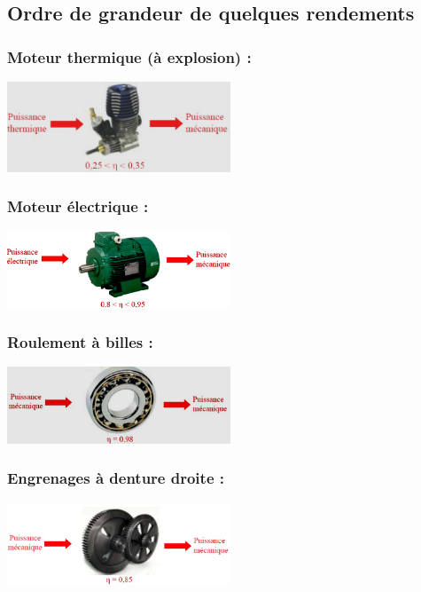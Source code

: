 \documentclass[10pt,fleqn]{article} %
\begin{document}
\subsection{Ordre de grandeur de quelques rendements}
\subsubsection{Moteur thermique (à explosion) :}
\begin{center}
    \includegraphics[width=0.5\textwidth]{Cours/images/thermique.png}
\end{center}

\subsubsection{Moteur électrique :}
\begin{center}
    \includegraphics[width=0.5\textwidth]{Cours/images/eletrique.png}
\end{center}

\subsubsection{Roulement à billes :}
\begin{center}
    \includegraphics[width=0.5\textwidth]{Cours/images/roulement.png}
\end{center}

\subsubsection{Engrenages à denture droite :}
\begin{center}
    \includegraphics[width=0.5\textwidth]{Cours/images/engrenage.png}
\end{center}
\end{document}
